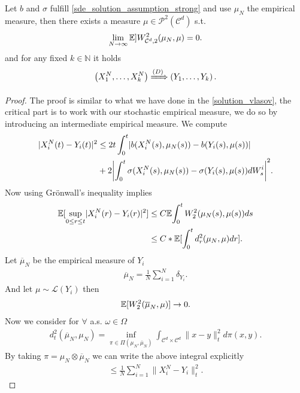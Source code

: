 \begin{theorem}
  Let $b$ and $\sigma$ fulfill \autoref{sde_solution_assumption_strong} and use 
  $\mu_N$ the empirical measure, then there exists a measure $\mu \in \mathcal{P}^2(\mathcal{C}^{d} )$ s.t. 
  \begin{align*}
    \lim_{N\to \infty}\E]W_{\mathcal{C}^{d},2 }^2(\mu_N,\mu ) = 0
  .\end{align*}
  and for any fixed $k \in  \mathbb{N}$ it holds
  \begin{align*}
    \left( X^{N}_1,\ldots ,X_k^{N}   \right)  \xRightarrow{(D)} \left( Y_{1},\ldots ,Y_{k}   \right) 
  .\end{align*}
\end{theorem}
\begin{proof}
  The proof is similar to what we have done in the \autoref{solution_vlasov}, the critical part is to 
  work with our stochastic empirical measure, we do so by introducing an intermediate empirical measure. We compute 
  \begin{align*}
    \abs{X_i^{N}(t) - Y_i(t) }^2 &\le 2 t \int_0^{t} \abs{b(X^{N}_i(s),\mu_N(s) ) -  b(Y_i(s),\mu(s) )} \\
    &+ 2 \abs*{\int_0^{t} \sigma(X_i^{N}(s),\mu_N(s) ) - \sigma(Y_i(s),\mu(s))  dW_s^{i} }^2
  .\end{align*}
  Now using Grönwall's inequality implies 
  \begin{align*}
    \mathbb{E}[\sup_{0\le r\le t} \lvert X_i^{N}(r) - Y_i(r) \rvert^2] &\le C \mathbb{E}{\int_0^{t} W_2^{2}(\mu_N(s),\mu(s))  } ds\\
                                                        &\le  C*\mathbb{E}[\int_0^{t} d_r^2(\mu_N,\mu ) dr]
  .\end{align*}
  Let $\overline{\mu }_N $ be the empirical measure of $Y_i$ 
  \begin{align*}
    \overline{\mu }_N = \frac{1}{N} \sum_{i=1}^{N} \delta_{Y_i}  
  .\end{align*}
  And let $\mu \sim \mathcal{L}(Y_i)$ then 
  \begin{align*}
    \mathbb{E}[W_2^2(\overline{\mu }_N,\mu  )] \to  0
  .\end{align*}
  Now we consider for $\forall $ a.s. $\omega  \in  \Omega $
  \begin{align*}
    d_t^2(\overline{\mu }_N,\mu_N ) = \inf_{\pi  \in  \Pi(\mu_N,\overline{\mu }_N )} \int_{\mathcal{C}^{d} \times  \mathcal{C}^{d}  } \|x-y\|^2_t d\pi(x,y) 
  .\end{align*}
  By taking $\pi  = \mu_N \otimes \overline{\mu }_N $ we can write the above integral explicitly 
  \begin{align*}
    \le \frac{1}{N} \sum_{i=1}^{N} \|X^{N}_i - Y_i \|_t^2 
  .\end{align*}
\end{proof}

